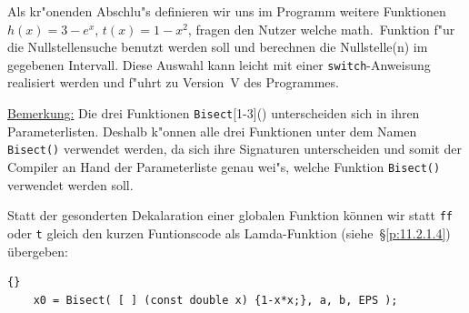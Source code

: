 Als kr"onenden Abschlu"s definieren wir uns im Programm weitere Funktionen
$h(x)=3-e^x$, $t(x)=1-x^2$, fragen den Nutzer welche math.\  Funktion
f"ur die Nullstellensuche benutzt werden soll und berechnen
die Nullstelle(n) im gegebenen Intervall.
Diese Auswahl kann leicht mit einer \verb|switch|-Anweisung realisiert werden und
f"uhrt zu Version~V des Programmes.

\underline{Bemerkung:}
Die drei Funktionen \verb|Bisect|[1-3]() unterscheiden sich in ihren
Parameterlisten. Deshalb k"onnen alle drei Funktionen unter dem Namen
\verb|Bisect()| verwendet werden, da sich ihre Signaturen unterscheiden
und somit der Compiler an Hand der Parameterliste genau wei"s, welche Funktion \verb|Bisect()|
verwendet werden soll.
%
%
%

Statt der gesonderten Dekalaration einer globalen Funktion können wir statt \verb|ff| oder \verb|t| 
gleich den kurzen Funtionscode als Lamda-Funktion (siehe~\S\ref{p:11.2.1.4}) übergeben:
\begin{lstlisting}[caption=Lambda-Funktion in Bisect,label=lst:7_9_18,basicstyle=\scriptsize]{}
    x0 = Bisect( [ ] (const double x) {1-x*x;}, a, b, EPS );
\end{lstlisting}






